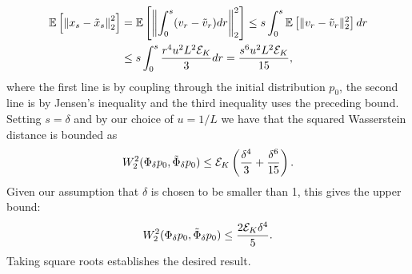 \begin{Proof}
%
\begin{align*}
\mathbb{E}\left[\left\| x_s - \tilde{x}_s\right\|_2^2\right] & = \mathbb{E}\left[\left\| \int_0^s (v_r - \tilde{v}_r) dr\right\|_2^2\right] \leq s\int_0^s \mathbb{E} \left[\lVert v_r - \tilde{v}_r \rVert_2^2\right]dr\\
& \le s \int_0^s \frac{r^4u^2L^2\mathcal{E}_K}{3}dr = \frac{s^6 u^2 L^2 \mathcal{E}_K }{15},
\end{align*}
where the first line is by coupling through the initial distribution $p_0$, the second line is by Jensen's inequality and the third inequality uses the preceding bound. Setting $s = \delta$ and by our choice of $u= 1/L$ we have that the squared Wasserstein distance is bounded as
\begin{align*}
W^2_2(\Phi_\delta p_0,\tilde{\Phi}_{\delta} p_0) \le \mathcal{E}_K \left(\frac{\delta^4}{3}+ \frac{\delta^6}{15}\right).
\end{align*}
Given our assumption that $\delta$ is chosen to be smaller than 1, this gives the upper bound:
\begin{align*}
W^2_2(\Phi_\delta p_0,\tilde{\Phi}_{\delta} p_0) \le \frac{2\mathcal{E}_K \delta^4}{5}.
\end{align*}
Taking square roots establishes the desired result.
\end{Proof}